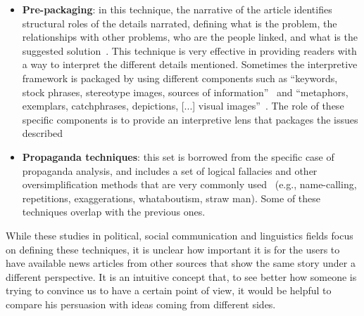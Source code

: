 \begin{itemize}
    
    \item \textbf{Pre-packaging}: in this technique, the narrative of the article identifies structural roles of the details narrated, defining what is the problem, the relationships with other problems, who are the people linked, and what is the suggested solution~\cite{entman1993framing,bell1991language}.
    This technique is very effective in providing readers with a way to interpret the different details mentioned.
    Sometimes the interpretive framework is packaged by using different components such as ``keywords, stock phrases, stereotype images, sources of information''~\cite{entman1993framing} and ``metaphors, exemplars, catchphrases, depictions, [...] visual images''~\cite{gamson1989media}.
    The role of these specific components is to provide an interpretive lens that packages the issues described
    
    \item \textbf{Propaganda techniques}: this set is borrowed from the specific case of propaganda analysis, and includes a set of logical fallacies and other oversimplification methods that are very commonly used~\cite{da2019fine} (e.g., name-calling, repetitions, exaggerations, whataboutism, straw man).
    Some of these techniques overlap with the previous ones.
\end{itemize}



While these studies in political, social communication and linguistics fields focus on defining these techniques, it is unclear how important it is for the users to have available news articles from other sources that show the same story under a different perspective.
It is an intuitive concept that, to see better how someone is trying to convince us to have a certain point of view, it would be helpful to compare his persuasion with ideas coming from different sides.

